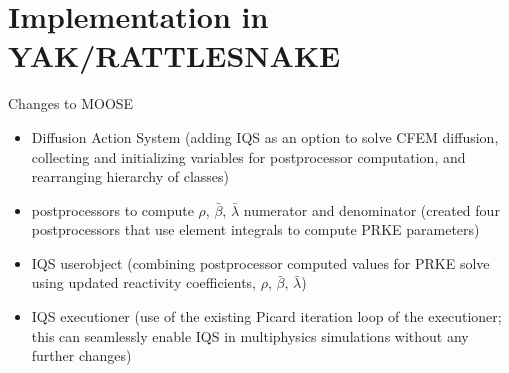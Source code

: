 \documentclass[8pt]{beamer}
\newcommand{\bi}{\begin{itemize}}
\newcommand{\ei}{\end{itemize}}
\begin{document}
\section{Implementation in YAK/RATTLESNAKE}

\begin{frame}{Changes to MOOSE}


\begin{block}{}
\bi
\item Diffusion Action System (adding IQS as an option to solve CFEM diffusion, collecting and initializing variables for postprocessor computation, and rearranging hierarchy of classes)
\item postprocessors to compute $\rho$, $\bar{\beta}$, $\bar{\lambda}$ numerator and denominator (created four postprocessors that use element integrals to compute PRKE parameters)
\item IQS userobject (combining postprocessor computed values for PRKE solve using updated reactivity coefficients, $\rho$, $\bar{\beta}$, $\bar{\lambda}$)
\item IQS executioner (use of the existing Picard iteration loop of the executioner; this can seamlessly enable IQS in multiphysics simulations without any further changes)
\ei
\end{block}

\end{frame}
\end{document}
